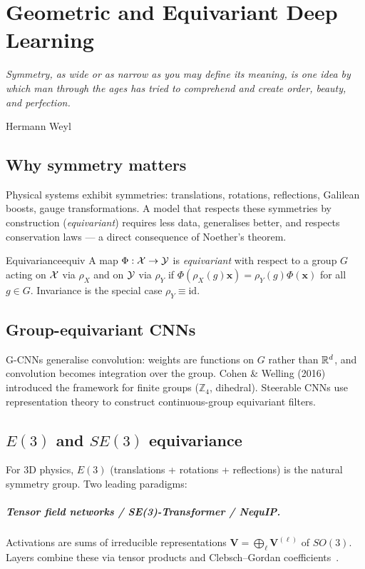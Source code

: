 \chapter{Geometric and Equivariant Deep Learning}
\label{ch:equivariant}

\epigraph{\itshape Symmetry, as wide or as narrow as you may define its
meaning, is one idea by which man through the ages has tried to
comprehend and create order, beauty, and perfection.}{Hermann Weyl}

\section{Why symmetry matters}
Physical systems exhibit symmetries: translations, rotations,
reflections, Galilean boosts, gauge transformations. A model that
respects these symmetries by construction (\emph{equivariant}) requires
less data, generalises better, and respects conservation laws --- a
direct consequence of Noether's theorem.

\begin{defn}{Equivariance}{equiv}
A map $\Phi:\mathcal{X}\to\mathcal{Y}$ is \emph{equivariant} with respect to a group $G$
acting on $\mathcal{X}$ via $\rho_X$ and on $\mathcal{Y}$ via $\rho_Y$ if
$\Phi(\rho_X(g)\bm{x}) = \rho_Y(g)\Phi(\bm{x})$ for all $g\in G$.
Invariance is the special case $\rho_Y\equiv \mathrm{id}$.
\end{defn}

\section{Group-equivariant CNNs}
G-CNNs generalise convolution: weights are functions on $G$ rather than
$\mathbb{R}^d$, and convolution becomes integration over the group. Cohen \&
Welling (2016) introduced the framework for finite groups
($\mathbb{Z}_4$, dihedral). Steerable CNNs use representation theory to
construct continuous-group equivariant filters.

\section{$E(3)$ and $SE(3)$ equivariance}
For 3D physics, $E(3)$ (translations + rotations + reflections) is the
natural symmetry group. Two leading paradigms:

\paragraph{Tensor field networks / SE(3)-Transformer / NequIP.}
Activations are sums of irreducible representations
$\mathbf{V}=\bigoplus_\ell \mathbf{V}^{(\ell)}$ of $SO(3)$. Layers
combine these via tensor products and Clebsch--Gordan
coefficients~\cite{thomas2018tfn,fuchs2020se3,batzner2022nequip}.

